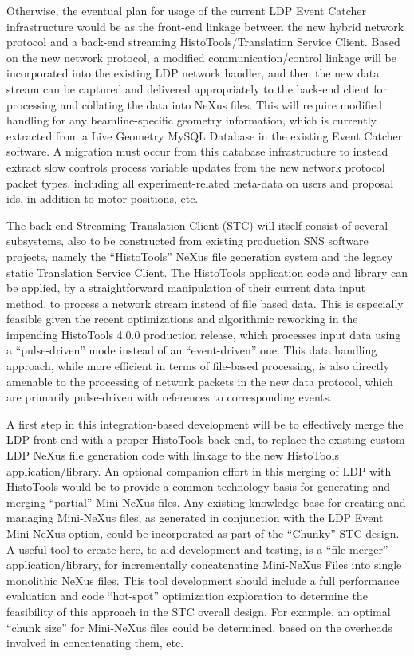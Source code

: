 Otherwise, the eventual plan for usage
of the current LDP Event Catcher infrastructure
would be as the front-end linkage between the new hybrid network protocol
and a back-end streaming HistoTools/Translation Service Client.
Based on the new network protocol,
a modified communication/control linkage will be incorporated
into the existing LDP network handler,
and then the new data stream can be captured and delivered appropriately
to the back-end client for processing
and collating the data into NeXus files.
This will require modified handling
for any beamline-specific geometry information,
which is currently extracted from a Live Geometry MySQL Database
in the existing Event Catcher software.
A migration must occur from this database infrastructure
to instead extract slow controls process variable updates
from the new network protocol packet types,
including all experiment-related meta-data on
users and proposal ids, in addition to motor positions, etc.

The back-end Streaming Translation Client (STC)
will itself consist of several subsystems,
also to be constructed from existing production SNS software projects,
namely the ``HistoTools'' NeXus file generation system
and the legacy static Translation Service Client.
The HistoTools application code and library can be applied,
by a straightforward manipulation of their current data input method,
to process a network stream instead of file based data.
This is especially feasible given the recent optimizations and
algorithmic reworking in the impending HistoTools 4.0.0 production release,
which processes input data using a ``pulse-driven'' mode
instead of an ``event-driven'' one.
This data handling approach,
while more efficient in terms of file-based processing,
is also directly amenable
to the processing of network packets in the new data protocol,
which are primarily pulse-driven with references to corresponding events.

A first step in this integration-based development
will be to effectively merge the LDP front end
with a proper HistoTools back end,
to replace the existing custom LDP NeXus file generation code
with linkage to the new HistoTools application/library.
An optional companion effort in this merging of LDP with HistoTools
would be to provide a common technology basis for
generating and merging ``partial'' Mini-NeXus files.
Any existing knowledge base for creating and managing Mini-NeXus files,
as generated in conjunction with the LDP Event Mini-NeXus option,
could be incorporated as part of the ``Chunky'' STC design.
A useful tool to create here, to aid development and testing,
is a ``file merger'' application/library,
for incrementally concatenating Mini-NeXus Files into
single monolithic NeXus files.
This tool development should include a full performance evaluation
and code ``hot-spot'' optimization exploration
to determine the feasibility of this approach in the STC overall design.
For example, an optimal ``chunk size'' for Mini-NeXus files
could be determined,
based on the overheads involved in concatenating them, etc.

